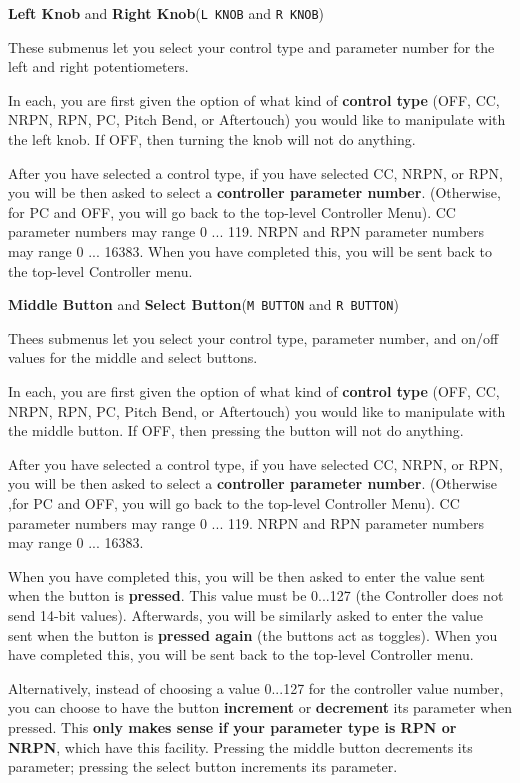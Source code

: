 \documentclass{article}
\begin{document}
\begin{description}
	\item{\bf Left Knob} and {\bf Right Knob}\quad (\texttt{L KNOB} and \texttt{R KNOB})
	
	These submenus let you select your control type and parameter number for the left and right potentiometers.
	
	In each, you are first given the option of what kind of {\bf control type} (OFF, CC, NRPN, RPN, PC, Pitch Bend, or Aftertouch) %
you would like to manipulate with the left knob.  If OFF, then turning the knob will not do anything.

	After you have selected a control type, if you have selected CC, NRPN, or RPN, you will be then asked to select a {\bf controller parameter number}.  (Otherwise, for PC and OFF, you will go back to the top-level Controller Menu).  CC parameter numbers may range 0 ... 119.  NRPN and RPN parameter numbers may range 0 ... 16383. When you have completed this, you will be sent back to the top-level Controller menu.

	\item{\bf Middle Button} and {\bf Select Button}\quad (\texttt{M BUTTON} and \texttt{R BUTTON})
	
	Thees submenus let you select your control type, parameter number, and on/off values for the middle and select buttons.
	
	In each, you are first given the option of what kind of {\bf control type} (OFF, CC, NRPN, RPN, PC, Pitch Bend, or Aftertouch) %
you would like to manipulate with the middle button.  If OFF, then pressing the button will not do anything.

	After you have selected a control type, if you have selected CC, NRPN, or RPN, you will be then asked to select a {\bf controller parameter number}.  (Otherwise ,for PC and OFF, you will go back to the top-level Controller Menu).  CC parameter numbers may range 0 ... 119.  NRPN and RPN parameter numbers may range 0 ... 16383.
	
	When you have completed this, you will be then asked to enter the value sent when the button is {\bf pressed}.  This value must be 0...127 (the Controller does not send 14-bit values).  Afterwards, you will be similarly asked to enter the value sent when the button is {\bf pressed again} (the buttons act as toggles).  When you have completed this, you will be sent back to the top-level Controller menu.
	
	Alternatively, instead of choosing a value 0...127 for the controller value number, you can choose to have the button {\bf increment} or {\bf decrement} its parameter when pressed.  This {\bf only makes sense if your parameter type is RPN or NRPN}, which have this facility.  Pressing the middle button decrements its parameter; pressing the select button increments its parameter.   
	

\end{description}
\end{document}
